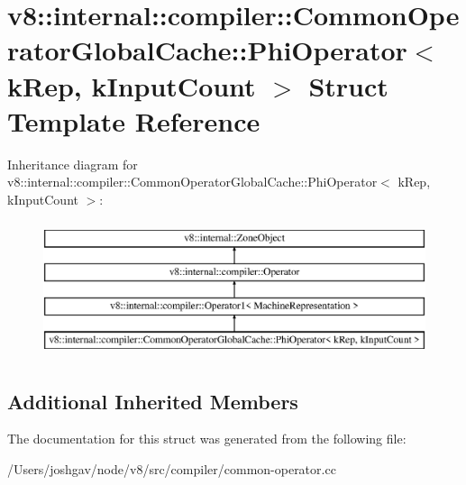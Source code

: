 \hypertarget{structv8_1_1internal_1_1compiler_1_1_common_operator_global_cache_1_1_phi_operator}{}\section{v8\+:\+:internal\+:\+:compiler\+:\+:Common\+Operator\+Global\+Cache\+:\+:Phi\+Operator$<$ k\+Rep, k\+Input\+Count $>$ Struct Template Reference}
\label{structv8_1_1internal_1_1compiler_1_1_common_operator_global_cache_1_1_phi_operator}
Inheritance diagram for v8\+:\+:internal\+:\+:compiler\+:\+:Common\+Operator\+Global\+Cache\+:\+:Phi\+Operator$<$ k\+Rep, k\+Input\+Count $>$\+:\begin{figure}[H]
\begin{center}
\leavevmode
\includegraphics[height=4.000000cm]{structv8_1_1internal_1_1compiler_1_1_common_operator_global_cache_1_1_phi_operator}
\end{center}
\end{figure}
\subsection*{Additional Inherited Members}


The documentation for this struct was generated from the following file\+:\begin{DoxyCompactItemize}
\item 
/\+Users/joshgav/node/v8/src/compiler/common-\/operator.\+cc\end{DoxyCompactItemize}
